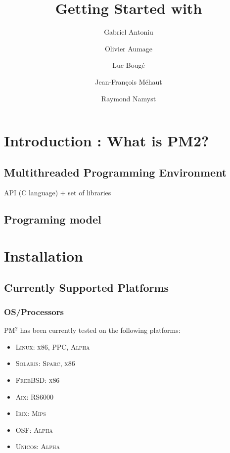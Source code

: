 \documentclass[a4paper,11pt]{article}
\title{Getting Started with \pm2}
\author{Gabriel Antoniu \and%
        Olivier Aumage \and%
        Luc Boug\'e \and%
        Jean-Fran\c{c}ois M\'ehaut \and%
        Raymond Namyst}
\def\pm2{PM$^2$\xspace}
\begin{document}
\maketitle


\section{Introduction : What is PM2?}

\subsection{Multithreaded Programming Environment}
        API (C language) + set of libraries

\subsection{Programing model}


\section{Installation}

\subsection{Currently Supported Platforms}

\subsubsection{OS/Processors}
\pm2 has been currently tested on the following platforms:
\begin{itemize}
\footnotesize
\item \textsc{Linux}: \textsc{x86}, \textsc{PPC}, \textsc{Alpha}
\item \textsc{Solaris}: \textsc{Sparc}, \textsc{x86}
\item \textsc{FreeBSD}: \textsc{x86}
\item \textsc{Aix}: \textsc{RS6000}
\item \textsc{Irix}: \textsc{Mips}
\item \textsc{OSF}: \textsc{Alpha}
\item \textsc{Unicos}: \textsc{Alpha}
\end{itemize}
\end{document}
